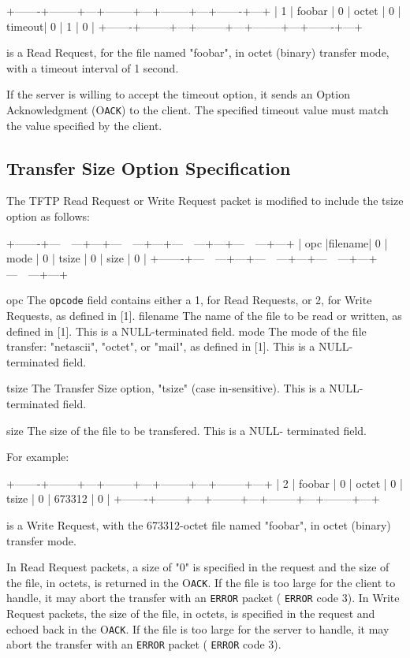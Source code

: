 \documentclass[12pt]{article}
\begin{document}
   +-------+--------+---+--------+---+--------+---+-------+---+
   |  1  | foobar | 0 | octet | 0 | timeout| 0 |  1  | 0 |
   +-------+--------+---+--------+---+--------+---+-------+---+

is a Read Request, for the file named "foobar", in octet (binary)
transfer mode, with a timeout interval of 1 second.

If the server is willing to accept the timeout option, it sends an
Option Acknowledgment (O\verb|ACK|) to the client. The specified timeout
value must match the value specified by the client.

\subsection{Transfer Size Option Specification}
The TFTP Read Request or Write Request packet is modified to include
the tsize option as follows:

   +-------+---~~---+---+---~~---+---+---~~---+---+---~~---+---+
   | opc |filename| 0 | mode | 0 | tsize | 0 | size | 0 |
   +-------+---~~---+---+---~~---+---+---~~---+---+---~~---+---+

   opc
     The \verb|opcode| field contains either a 1, for Read Requests, or 2,
     for Write Requests, as defined in [1].
   filename
     The name of the file to be read or written, as defined in [1].
     This is a NULL-terminated field.
   mode
     The mode of the file transfer: "netascii", "octet", or "mail",
     as defined in [1]. This is a NULL-terminated field.

   tsize
     The Transfer Size option, "tsize" (case in-sensitive). This is
     a NULL-terminated field.

   size
     The size of the file to be transfered. This is a NULL-
     terminated field.

For example:

   +-------+--------+---+--------+---+--------+---+--------+---+
   |  2  | foobar | 0 | octet | 0 | tsize | 0 | 673312 | 0 |
   +-------+--------+---+--------+---+--------+---+--------+---+

is a Write Request, with the 673312-octet file named "foobar", in
octet (binary) transfer mode.

In Read Request packets, a size of "0" is specified in the request
and the size of the file, in octets, is returned in the O\verb|ACK|. If the
file is too large for the client to handle, it may abort the transfer
with an  \verb|ERROR| packet ( \verb|ERROR| code 3). In Write Request packets, the
size of the file, in octets, is specified in the request and echoed
back in the O\verb|ACK|. If the file is too large for the server to handle,
it may abort the transfer with an  \verb|ERROR| packet ( \verb|ERROR| code 3).
  
\end{document}
